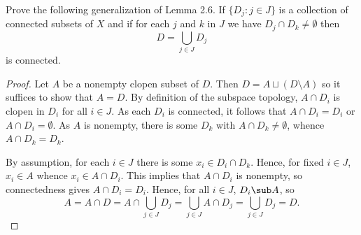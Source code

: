 \documentclass[12pt]{article}
\begin{document}
\begin{homeworkProblem}
Prove the following generalization of Lemma 2.6. If $\{D_j : j \in J\}$ is a 
collection of connected subsets of $X$ and if for each $j$ and $k$ in $J$ we have 
$D_j \cap D_k \neq \emptyset$ then 
\[
D = \bigcup_{j \in J} D_j
\]
is connected.  

\begin{proof}
 Let $ A $ be a nonempty clopen subset of $ D $. Then $ D = A\sqcup (D\setminus A) $ so it suffices to show that $ A=D $. By definition of the subspace topology, $ A\cap D_{i} $ is clopen in $ D_{i} $ for all $ i\in J $. As each $ D_{i} $ is connected, it follows that $ A\cap D_{i}= D_{i} $ or $ A\cap D_{i}=\emptyset $. As $ A $ is nonempty, there is some $ D_{k} $ with $ A\cap D_{k}\neq \emptyset$, whence $ A\cap D_{k} = D_{k} $.

 By assumption, for each $ i\in J $ there is some $ x_{i}\in D_{i}\cap D_{k} $. Hence, for fixed $ i\in J $, $ x_{i}\in A $ whence $ x_{i}\in A\cap D_{i} $. This implies that $ A\cap D_{i} $ is nonempty, so connectedness gives $ A\cap D_{i}= D_{i} $. Hence, for all $ i\in J $, $ D_{i}\sub A $, so
  \[
    A = A\cap D = A\cap \bigcup_{j\in J} D_{j} = \bigcup_{j\in J} A\cap D_{j} = \bigcup_{j\in J} D_{j} = D.
  \] 
\end{proof}

\end{homeworkProblem}
\end{document}

